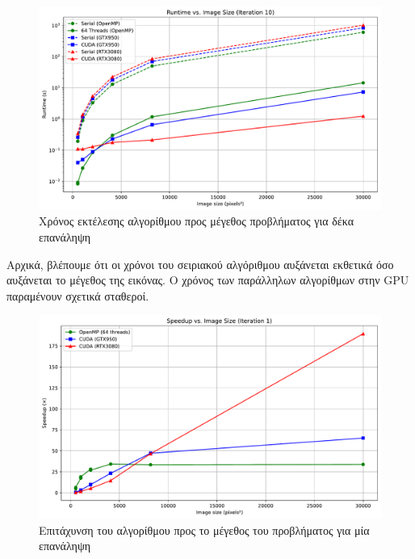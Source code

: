 \begin{figure}[H]
    \centering
    \includegraphics[width=\linewidth]{./pics/runtimeCurves_10.pdf}
    \caption{Χρόνος εκτέλεσης αλγορίθμου προς μέγεθος προβλήματος για δέκα επανάληψη}
\end{figure}

Αρχικά, βλέπουμε ότι οι χρόνοι του σειριακού αλγόριθμου αυξάνεται εκθετικά όσο αυξάνεται το μέγεθος της εικόνας. Ο χρόνος των παράλληλων αλγορίθμων στην GPU παραμένουν σχετικά σταθεροί.

\begin{figure}[H]
    \centering
    \includegraphics[width=\linewidth]{./pics/speedupCurves_1.pdf}
    \caption{Επιτάχυνση του αλγορίθμου προς το μέγεθος του προβλήματος για μία επανάληψη}
\end{figure}

